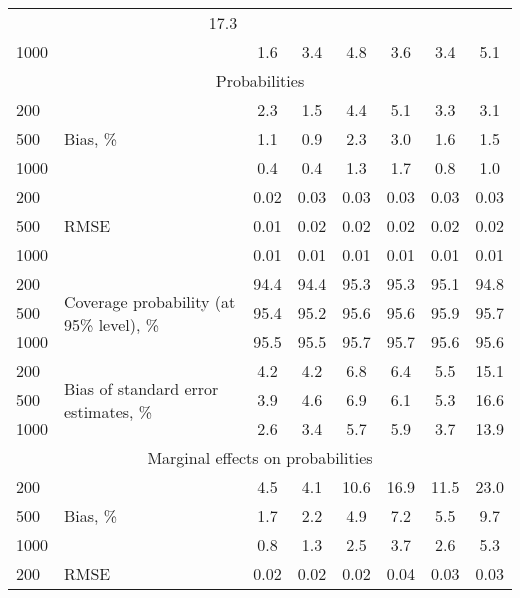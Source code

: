 \documentclass[letterpaper,fleqn,11pt]{article}
\begin{document}
\begin{table}[htbp]
\begin{tabular}{rrcccccc}
& 17.3 \\ 
\multicolumn{1}{l}{1000} & \multicolumn{1}{l}{} & 1.6 & 3.4 & 4.8 & 3.6 & 3.4
& 5.1 \\ 
\multicolumn{8}{c}{Probabilities} \\ 
\multicolumn{1}{l}{200} & \multicolumn{1}{l}{\multirow{3}[1]{*}{Bias, \%}} & 
2.3 & 1.5 & 4.4 & 5.1 & 3.3 & 3.1 \\ 
\multicolumn{1}{l}{500} & \multicolumn{1}{l}{} & 1.1 & 0.9 & 2.3 & 3.0 & 1.6
& 1.5 \\ 
\multicolumn{1}{l}{1000} & \multicolumn{1}{l}{} & 0.4 & 0.4 & 1.3 & 1.7 & 0.8
& 1.0 \\ 
\multicolumn{1}{l}{200} & \multicolumn{1}{l}{\multirow{3}[2]{*}{RMSE}} & 0.02
& 0.03 & 0.03 & 0.03 & 0.03 & 0.03 \\ 
\multicolumn{1}{l}{500} & \multicolumn{1}{l}{} & 0.01 & 0.02 & 0.02 & 0.02 & 
0.02 & 0.02 \\ 
\multicolumn{1}{l}{1000} & \multicolumn{1}{l}{} & 0.01 & 0.01 & 0.01 & 0.01
& 0.01 & 0.01 \\ 
\multicolumn{1}{l}{200} & \multicolumn{1}{l}{\multirow{3}[2]{4cm}{Coverage
probability (at 95\% level), \%}} & 94.4 & 94.4 & 95.3 & 95.3 & 95.1 & 94.8
\\ 
\multicolumn{1}{l}{500} & \multicolumn{1}{l}{} & 95.4 & 95.2 & 95.6 & 95.6 & 
95.9 & 95.7 \\ 
\multicolumn{1}{l}{1000} & \multicolumn{1}{l}{} & 95.5 & 95.5 & 95.7 & 95.7
& 95.6 & 95.6 \\ 
\multicolumn{1}{l}{200} & \multicolumn{1}{l}{\multirow{3}[2]{4cm}{Bias of
standard error estimates, \%}} & 4.2 & 4.2 & 6.8 & 6.4 & 5.5 & 15.1 \\ 
\multicolumn{1}{l}{500} & \multicolumn{1}{l}{} & 3.9 & 4.6 & 6.9 & 6.1 & 5.3
& 16.6 \\ 
\multicolumn{1}{l}{1000} & \multicolumn{1}{l}{} & 2.6 & 3.4 & 5.7 & 5.9 & 3.7
& 13.9 \\ 
\multicolumn{8}{c}{Marginal effects on probabilities} \\ 
\multicolumn{1}{l}{200} & \multicolumn{1}{l}{\multirow{3}[1]{*}{Bias, \%}} & 
4.5 & 4.1 & 10.6 & 16.9 & 11.5 & 23.0 \\ 
\multicolumn{1}{l}{500} & \multicolumn{1}{l}{} & 1.7 & 2.2 & 4.9 & 7.2 & 5.5
& 9.7 \\ 
\multicolumn{1}{l}{1000} & \multicolumn{1}{l}{} & 0.8 & 1.3 & 2.5 & 3.7 & 2.6
& 5.3 \\ 
\multicolumn{1}{l}{200} & \multicolumn{1}{l}{\multirow{3}[2]{*}{RMSE}} & 0.02
& 0.02 & 0.02 & 0.04 & 0.03 & 0.03 \\ 

\end{tabular}
\end{table}
\end{document}
